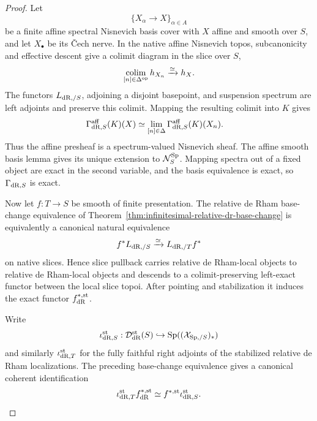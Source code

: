\begin{proof}
Let
\[
    \{X_\alpha\to X\}_{\alpha\in A}
\]
be a finite affine spectral Nisnevich basis cover with $X$ affine and smooth
over $S$, and let $X_\bullet$ be its \v{C}ech nerve.  In the native affine
Nisnevich topos, subcanonicity and effective descent give a colimit diagram in
the slice over $S$,
\[
    \operatorname*{colim}_{[n]\in\Delta^{\mathrm{op}}}h_{X_n}
    \xrightarrow{\simeq}
    h_X.
\]
The functors $L_{\mathrm{dR},/S}$, adjoining a disjoint basepoint, and suspension
spectrum are left adjoints and preserve this colimit.  Mapping the resulting
colimit into $K$ gives
\[
\begin{aligned}
    \Gamma_{\mathrm{dR},S}^{\mathrm{aff}}(K)(X)
    &\simeq
    \operatorname*{lim}_{[n]\in\Delta}
    \Gamma_{\mathrm{dR},S}^{\mathrm{aff}}(K)(X_n).
\end{aligned}
\]
Thus the affine presheaf is a spectrum-valued Nisnevich sheaf.  The affine
smooth basis lemma gives its unique extension to $\mathcal N_S^{\mathrm{Sp}}$.
Mapping spectra out of a fixed object are exact in the second variable, and
the basis equivalence is exact, so $\Gamma_{\mathrm{dR},S}$ is exact.

Now let $f:T\to S$ be smooth of finite presentation.  The relative de Rham
base-change equivalence of
Theorem~\ref{thm:infinitesimal-relative-dr-base-change} is equivalently a
canonical natural equivalence
\[
    f^*L_{\mathrm{dR},/S}
    \xrightarrow{\simeq}
    L_{\mathrm{dR},/T}f^*
\]
on native slices.  Hence slice pullback carries relative de Rham-local objects
to relative de Rham-local objects and descends to a colimit-preserving
left-exact functor between the local slice topoi.  After pointing and
stabilization it induces the exact functor $f_{\mathrm{dR}}^{*,\mathrm{st}}$.

Write
\[
    \iota_{\mathrm{dR},S}^{\mathrm{st}}:
    \mathcal D_{\mathrm{dR}}^{\mathrm{st}}(S)
    \hookrightarrow
    \operatorname{Sp}((\mathcal X_{\mathrm{Sp},/S})_*)
\]
and similarly $\iota_{\mathrm{dR},T}^{\mathrm{st}}$ for the fully faithful right
adjoints of the stabilized relative de Rham localizations.  The preceding
base-change equivalence gives a canonical coherent identification
\[
    \iota_{\mathrm{dR},T}^{\mathrm{st}}f_{\mathrm{dR}}^{*,\mathrm{st}}
    \simeq
    f^{*,\mathrm{st}}\iota_{\mathrm{dR},S}^{\mathrm{st}}.
\]


\end{proof}
